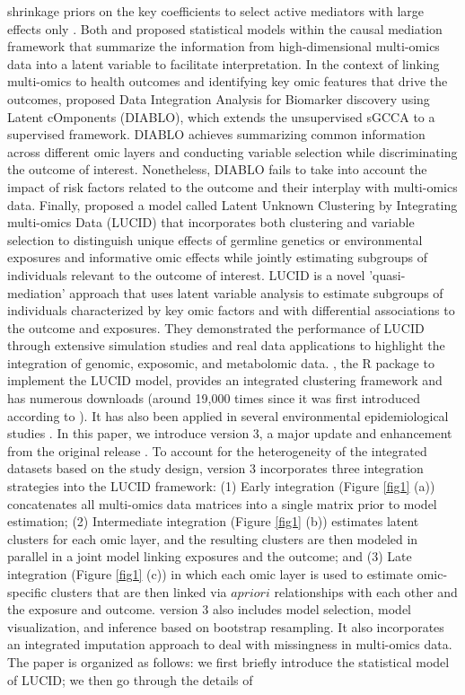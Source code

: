 shrinkage priors on the key coefficients to select active mediators with large effects only \citep{song2020bayesian}. Both \citet{albert2016causal} and \citet{derkach2019high} proposed statistical models within the causal mediation framework that summarize the information from high-dimensional multi-omics data into a latent variable to facilitate interpretation. 
In the context of linking multi-omics to health outcomes and identifying key omic features that drive the outcomes, \citet{singh2019diablo} proposed Data Integration Analysis for Biomarker discovery using Latent cOmponents (DIABLO), which extends the unsupervised sGCCA to a supervised framework. DIABLO achieves summarizing common information across different omic layers and conducting variable selection while discriminating the outcome of interest. Nonetheless, DIABLO fails to take into account the impact of risk factors related to the outcome and their interplay with multi-omics data. Finally, \citet{peng2020latent} proposed a model called Latent Unknown Clustering by Integrating multi-omics Data (LUCID) that incorporates both clustering and variable selection to distinguish unique effects of germline genetics or environmental exposures and informative omic effects while jointly estimating subgroups of individuals relevant to the outcome of interest. LUCID is a novel 'quasi-mediation' approach that uses latent variable analysis to estimate subgroups of individuals characterized by key omic factors and with differential associations to the outcome and exposures. They demonstrated the performance of LUCID through extensive simulation studies and real data applications to highlight the integration of genomic, exposomic, and metabolomic data. , the R package to implement the LUCID model, provides an integrated clustering framework and has numerous downloads (around 19,000 times since it was first introduced according to  \citep{yu2022dlstats}). It has also been applied in several environmental epidemiological studies \citep{jin2020perfluoroalkyl, stratakis2020prenatal, matta2022associations}. In this paper, we introduce  version 3, a major update and enhancement from the original release \citep{LUCIDus}. To account for the heterogeneity of the integrated datasets based on the study design,  version 3 incorporates three integration strategies into the LUCID framework: (1) Early integration (Figure \ref{fig1} (a)) concatenates all multi-omics data matrices into a single matrix prior to model estimation; (2) Intermediate integration (Figure \ref{fig1} (b)) estimates latent clusters for each omic layer, and the resulting clusters are then modeled in parallel in a joint model linking exposures and the outcome; and (3) Late integration (Figure \ref{fig1} (c)) in which each omic layer is used to estimate omic-specific clusters that are then linked via $a priori$ relationships with each other and the exposure and outcome.  version 3 also includes model selection, model visualization, and inference based on bootstrap resampling. It also incorporates an integrated imputation approach to deal with missingness in multi-omics data. The paper is organized as follows: we first briefly introduce the statistical model of LUCID; we then go through the details of 